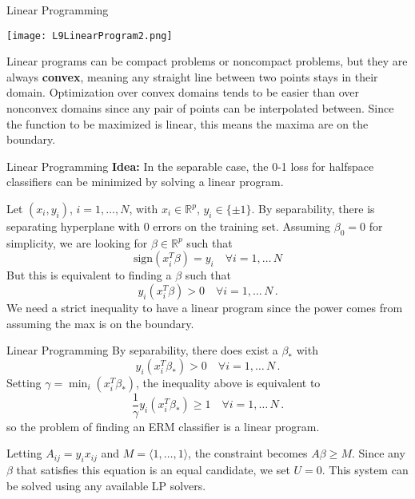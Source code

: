 \documentclass[10pt, table, dvipsnames,xcdraw, handout]{beamer}
\newcommand{\bR}{\ensuremath{\mathbb{R}}}
\begin{document}
\begin{frame}[fragile]{Linear Programming}
  \begin{minipage}[t][0.5\textheight][t]{\textwidth}
	\centering \texttt{[image: L9LinearProgram2.png]} 
  \end{minipage}
  \vfill
\begin{minipage}[t][0.5\textheight][t]{\textwidth}
Linear programs can be compact problems or noncompact problems, but they are always \textbf{convex}, meaning any straight line between two points stays in their domain. \pause Optimization over convex domains tends to be easier than over nonconvex domains since any pair of points can be interpolated between. \pause Since the function to be maximized is linear, this means the maxima are on the boundary.
\end{minipage}
\end{frame}



\begin{frame}[fragile]{Linear Programming}
\textbf{Idea:} In the separable case, the 0-1 loss for halfspace classifiers can be minimized by solving a linear program. \pause 

Let $(x_i, y_i)$, $i=1,\ldots, N$, with $x_i\in \bR^p$, $y_i\in\{\pm 1\}$. By separability, there is separating hyperplane with 0 errors on the training set. Assuming $\beta_0 = 0$ for simplicity, we are looking for $\beta\in \bR^p$ such that 
$$
\text{sign}(x_i^T\beta) =  y_i\hspace{1em}\forall i = 1,\ldots \,N
$$\pause
But this is equivalent to finding a $\beta$ such that
$$
y_i(x_i^T\beta) > 0 \hspace{1em}\forall i = 1,\ldots \,N\,.
$$
We need a strict inequality to have a linear program since the power comes from assuming the max is on the boundary. 
\end{frame}



\begin{frame}[fragile]{Linear Programming}
By separability, there does exist a $\beta_*$ with
$$
y_i(x_i^T\beta_*) > 0 \hspace{1em}\forall i = 1,\ldots \,N\,.
$$\pause
Setting $\gamma = \min_i (x_i^T\beta_*)$, the inequality above is equivalent to
$$
\frac{1}{\gamma}y_i(x_i^T\beta_*) \geq 1  \hspace{1em}\forall i = 1,\ldots \,N\,.
$$
so the problem of finding an ERM classifier is a linear program. \pause 

Letting $A_{ij} = y_ix_{ij}$ and $M = \langle1,\ldots, 1\rangle$, the constraint becomes $A\beta \geq M$. Since any $\beta$ that satisfies this equation is an equal candidate, we set $U = 0$. \pause This system can be solved using any available LP solvers.
\end{frame}
\end{document}
